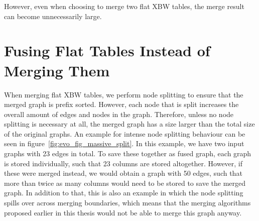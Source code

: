 \documentclass[a4paper,12pt,twoside,BCOR=10mm]{scrbook}
\begin{document}
However, even when choosing to merge two flat XBW tables,
the merge result can become unnecessarily large.


\section{Fusing Flat Tables Instead of Merging Them}
%

When merging flat XBW tables, we perform node splitting to ensure that the
merged graph is prefix sorted.
However, each node that is split increases the overall amount of edges
and nodes in the graph.
Therefore, unless no node splitting is necessary at all,
the merged graph has a size larger than the total size of the
original graphs. An example for intense node splitting behaviour can
be seen in figure~\ref{fig:evo_fig_massive_split}.
In this example, we have two input graphs with 23 edges in total.
To save these together as fused graph, each graph is stored individually,
such that 23 columns are stored altogether.
However, if these were merged instead, we would obtain a graph with 50 edges,
such that more than twice as many columns would need to be stored to save the
merged graph.
In addition to that, this is also an example in which the node splitting spills over
across merging boundaries, which means that the merging algorithms proposed earlier
in this thesis would not be able to merge this graph anyway.
\end{document}
